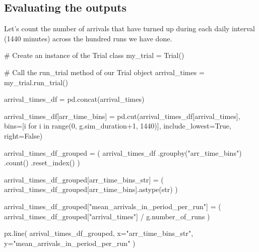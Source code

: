 \documentclass[
  letterpaper,
  DIV=11,
  numbers=noendperiod]{scrreprt}
\newenvironment{Shaded}{\begin{snugshade}}{\end{snugshade}}
\newcommand{\BuiltInTok}[1]{\textcolor[rgb]{0.00,0.23,0.31}{#1}}
\newcommand{\CommentTok}[1]{\textcolor[rgb]{0.37,0.37,0.37}{#1}}
\newcommand{\ControlFlowTok}[1]{\textcolor[rgb]{0.00,0.23,0.31}{#1}}
\newcommand{\DecValTok}[1]{\textcolor[rgb]{0.68,0.00,0.00}{#1}}
\newcommand{\KeywordTok}[1]{\textcolor[rgb]{0.00,0.23,0.31}{#1}}
\newcommand{\NormalTok}[1]{\textcolor[rgb]{0.00,0.23,0.31}{#1}}
\newcommand{\OperatorTok}[1]{\textcolor[rgb]{0.37,0.37,0.37}{#1}}
\newcommand{\StringTok}[1]{\textcolor[rgb]{0.13,0.47,0.30}{#1}}
\newcommand{\VariableTok}[1]{\textcolor[rgb]{0.07,0.07,0.07}{#1}}
\begin{document}
\subsection{Evaluating the outputs}\label{evaluating-the-outputs-6}

Let's count the number of arrivals that have turned up during each daily
interval (1440 minutes) across the hundred runs we have done.

\begin{Shaded}
\begin{Highlighting}[]
\CommentTok{\# Create an instance of the Trial class}
\NormalTok{my\_trial }\OperatorTok{=}\NormalTok{ Trial()}

\CommentTok{\# Call the run\_trial method of our Trial object}
\NormalTok{arrival\_times }\OperatorTok{=}\NormalTok{ my\_trial.run\_trial()}

\NormalTok{arrival\_times\_df }\OperatorTok{=}\NormalTok{ pd.concat(arrival\_times)}

\NormalTok{arrival\_times\_df[}\StringTok{\textquotesingle{}arr\_time\_bins\textquotesingle{}}\NormalTok{] }\OperatorTok{=}\NormalTok{ pd.cut(arrival\_times\_df[}\StringTok{\textquotesingle{}arrival\_times\textquotesingle{}}\NormalTok{], bins}\OperatorTok{=}\NormalTok{[i }\ControlFlowTok{for}\NormalTok{ i }\KeywordTok{in} \BuiltInTok{range}\NormalTok{(}\DecValTok{0}\NormalTok{, g.sim\_duration}\OperatorTok{+}\DecValTok{1}\NormalTok{, }\DecValTok{1440}\NormalTok{)], include\_lowest}\OperatorTok{=}\VariableTok{True}\NormalTok{, right}\OperatorTok{=}\VariableTok{False}\NormalTok{)}

\NormalTok{arrival\_times\_df\_grouped }\OperatorTok{=}\NormalTok{ (}
\NormalTok{  arrival\_times\_df}
\NormalTok{  .groupby(}\StringTok{"arr\_time\_bins"}\NormalTok{)}
\NormalTok{  .count()}
\NormalTok{  .reset\_index()}
\NormalTok{)}
\end{Highlighting}
\end{Shaded}

\begin{Shaded}
\begin{Highlighting}[]
\NormalTok{arrival\_times\_df\_grouped[}\StringTok{\textquotesingle{}arr\_time\_bins\_str\textquotesingle{}}\NormalTok{] }\OperatorTok{=}\NormalTok{ (}
\NormalTok{  arrival\_times\_df\_grouped[}\StringTok{\textquotesingle{}arr\_time\_bins\textquotesingle{}}\NormalTok{].astype(}\StringTok{\textquotesingle{}str\textquotesingle{}}\NormalTok{)}
\NormalTok{)}

\NormalTok{arrival\_times\_df\_grouped[}\StringTok{"mean\_arrivals\_in\_period\_per\_run"}\NormalTok{] }\OperatorTok{=}\NormalTok{ (}
\NormalTok{  arrival\_times\_df\_grouped[}\StringTok{"arrival\_times"}\NormalTok{] }\OperatorTok{/}\NormalTok{ g.number\_of\_runs}
\NormalTok{)}

\NormalTok{px.line(}
\NormalTok{  arrival\_times\_df\_grouped,}
\NormalTok{  x}\OperatorTok{=}\StringTok{"arr\_time\_bins\_str"}\NormalTok{,}
\NormalTok{  y}\OperatorTok{=}\StringTok{"mean\_arrivals\_in\_period\_per\_run"}
\NormalTok{)}
\end{Highlighting}
\end{Shaded}
\end{document}
